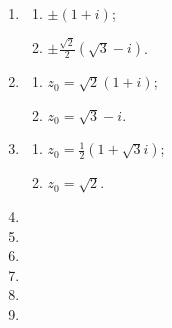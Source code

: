 \documentclass[a4paper, 11pt]{article}
\begin{document}
\begin{enumerate}
    \item %
        \begin{multicols}{2}
            \begin{enumerate}
                \item $\pm(1+i)$;
                \item $\pm\frac{\sqrt{2}}{2}(\sqrt{3}-i)$.   
            \end{enumerate}
        \end{multicols}
    \item %
        \begin{multicols}{2}
            \begin{enumerate}
                \item $z_0 = \sqrt{2}(1+i)$;
                \item $z_0 =\sqrt{3} - i$.
            \end{enumerate}
        \end{multicols}
    \item %
        \begin{multicols}{2}
            \begin{enumerate}
                \item $z_0 = \frac12(1+\sqrt{3}i)$;
                \item $z_0 = \sqrt{2}$.
            \end{enumerate}
        \end{multicols}
    \item %
    \item %
    \item %
    \item %
    \item %
    \item %
\end{enumerate}
\end{document}
